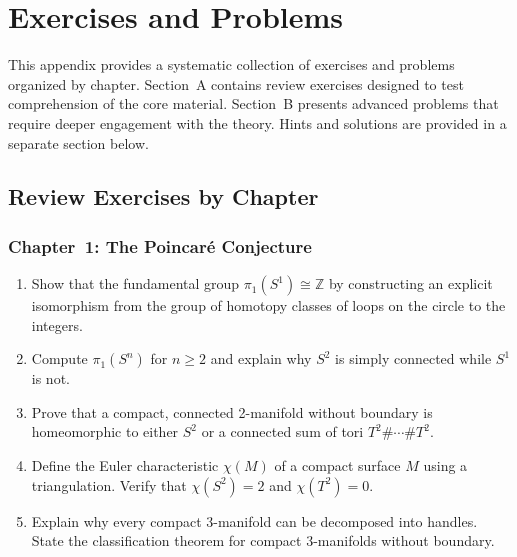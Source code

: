 \chapter{Exercises and Problems}
\label{ch:appendix-problems}

This appendix provides a systematic collection of exercises and problems organized by chapter. Section~A contains review exercises designed to test comprehension of the core material. Section~B presents advanced problems that require deeper engagement with the theory. Hints and solutions are provided in a separate section below.

\section{Review Exercises by Chapter}
\label{sec:review-exercises}

\subsection{Chapter~1: The Poincar\'{e} Conjecture}

\begin{enumerate}[label=\textbf{1.\arabic*.},leftmargin=2.5em]
\item Show that the fundamental group $\pi_1(S^1) \cong \mathbb{Z}$ by constructing an explicit isomorphism from the group of homotopy classes of loops on the circle to the integers.

\item Compute $\pi_1(S^n)$ for $n \geq 2$ and explain why $S^2$ is simply connected while $S^1$ is not.

\item Prove that a compact, connected 2-manifold without boundary is homeomorphic to either $S^2$ or a connected sum of tori $T^2 \# \cdots \# T^2$.

\item Define the Euler characteristic $\chi(M)$ of a compact surface $M$ using a triangulation. Verify that $\chi(S^2) = 2$ and $\chi(T^2) = 0$.

\item Explain why every compact 3-manifold can be decomposed into handles. State the classification theorem for compact 3-manifolds without boundary.
\end{enumerate}

